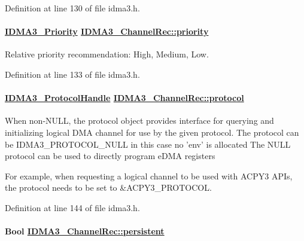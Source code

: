 Definition at line 130 of file idma3.h.\hypertarget{struct_i_d_m_a3___channel_rec_e8b3740a842ad7ebb28cecf135f0c88f}{
\paragraph[priority]{\setlength{\rightskip}{0pt plus 5cm}\hyperlink{group___d_s_p_i_d_m_a3_gfa41dccd2cc8f94915fffdda2c8b4a59}{IDMA3\_\-Priority} \hyperlink{struct_i_d_m_a3___channel_rec_e8b3740a842ad7ebb28cecf135f0c88f}{IDMA3\_\-Channel\-Rec::priority}}\hfill}
\label{struct_i_d_m_a3___channel_rec_e8b3740a842ad7ebb28cecf135f0c88f}


Relative priority recommendation: High, Medium, Low. 

Definition at line 133 of file idma3.h.\hypertarget{struct_i_d_m_a3___channel_rec_a7a4ff7549fd7be65a22cba0b8d50fad}{
\paragraph[protocol]{\setlength{\rightskip}{0pt plus 5cm}\hyperlink{struct_i_d_m_a3___protocol_obj}{IDMA3\_\-Protocol\-Handle} \hyperlink{struct_i_d_m_a3___channel_rec_a7a4ff7549fd7be65a22cba0b8d50fad}{IDMA3\_\-Channel\-Rec::protocol}}\hfill}
\label{struct_i_d_m_a3___channel_rec_a7a4ff7549fd7be65a22cba0b8d50fad}


When non-NULL, the protocol object provides interface for querying and initializing logical DMA channel for use by the given protocol. The protocol can be IDMA3\_\-PROTOCOL\_\-NULL in this case no 'env' is allocated The NULL protocol can be used to directly program e\-DMA registers

For example, when requesting a logical channel to be used with ACPY3 APIs, the protocol needs to be set to \&ACPY3\_\-PROTOCOL. 

Definition at line 144 of file idma3.h.\hypertarget{struct_i_d_m_a3___channel_rec_c7a418727b547fe8f9d88f74f7d4c764}{
\paragraph[persistent]{\setlength{\rightskip}{0pt plus 5cm}Bool \hyperlink{struct_i_d_m_a3___channel_rec_c7a418727b547fe8f9d88f74f7d4c764}{IDMA3\_\-Channel\-Rec::persistent}}\hfill}
\label{struct_i_d_m_a3___channel_rec_c7a418727b547fe8f9d88f74f7d4c764}


